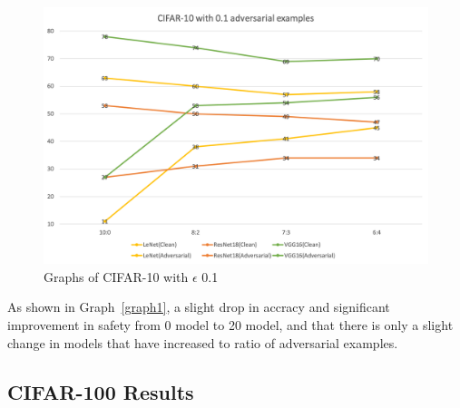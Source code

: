 \documentclass[journal,article,submit,moreauthors,pdftex]{Definitions/mdpi}
\begin{document}
\begin{figure}[H]
    \includegraphics[width=13 cm]{Definitions/graph-01cifar10.png}
    \caption{Graphs of CIFAR-10 with \begin{math}\epsilon\end{math} 0.1\label{graph2}}
\end{figure} 

As shown in Graph~\ref{graph1}, a slight drop in accracy and significant improvement in safety from 0 model to 20 model, and that there is only a slight change in models that have increased to ratio of adversarial examples.

\subsection{CIFAR-100 Results}
\end{document}
